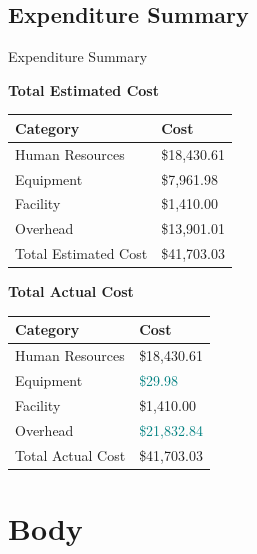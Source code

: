 \documentclass[17pt, aspectratio=169]{beamer}
\begin{document}
\subsection*{Expenditure Summary}
\begin{frame}{Expenditure Summary}
	\begin{center}
		\textbf{Total Estimated Cost}
		\begin{tabular}{||m{}|m{}||}
			\hline
			Category             & Cost        \\
			\hline
			Human Resources      & \$18,430.61 \\
			\hline
			Equipment            & \$7,961.98  \\
			\hline
			Facility             & \$1,410.00  \\
			\hline
			Overhead             & \$13,901.01 \\
			\hline
			Total Estimated Cost & \$41,703.03 \\
			\hline
		\end{tabular}
	\end{center}
\end{frame}
\begin{frame}
	\begin{center}
		\textbf{Total Actual Cost}
		\begin{tabular}{||m{}|m{}||}
			\hline
			Category          & Cost                          \\
			\hline
			Human Resources   & \$18,430.61                   \\
			\hline
			Equipment         & \textcolor{teal}{\$29.98}     \\
			\hline
			Facility          & \$1,410.00                    \\
			\hline
			Overhead          & \textcolor{teal}{\$21,832.84} \\
			\hline
			Total Actual Cost & \$41,703.03                   \\
			\hline
		\end{tabular}
	\end{center}
\end{frame}
\section{Body}
\end{document}

